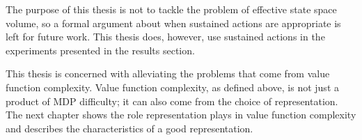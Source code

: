 The purpose of this thesis is not to tackle the problem of effective
state space volume, so
a formal argument about when sustained actions are appropriate is left for
future work.
This thesis does, however, use sustained actions  in the experiments
presented in the results section.

This thesis is concerned with alleviating the problems that come from
value function complexity.
Value function complexity, as defined above, is not just a product of
MDP difficulty; it can also come from the choice of representation.
The next chapter shows the role representation plays in value function
complexity and describes the characteristics of a good representation.